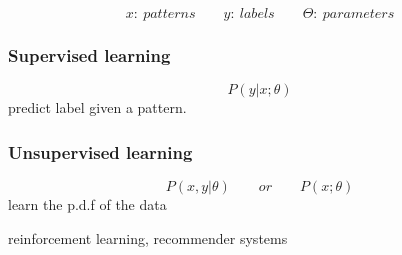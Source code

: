 \begin{slide}[Basics]
	$$x:~patterns \qquad y:~labels \qquad \Theta:~parameters$$
	\begin{multicols}{2}
		\subsubsection*{Supervised learning}
			$$P(y|x;\theta)$$
			predict label given a pattern.
		\subsubsection*{Unsupervised learning}
			$$P(x,y |\theta) \qquad or \qquad P(x;\theta)  $$
			learn the p.d.f of the data
	\end{multicols}
	reinforcement learning, recommender systems
\end{slide}
\begin{slide}

\end{slide}
